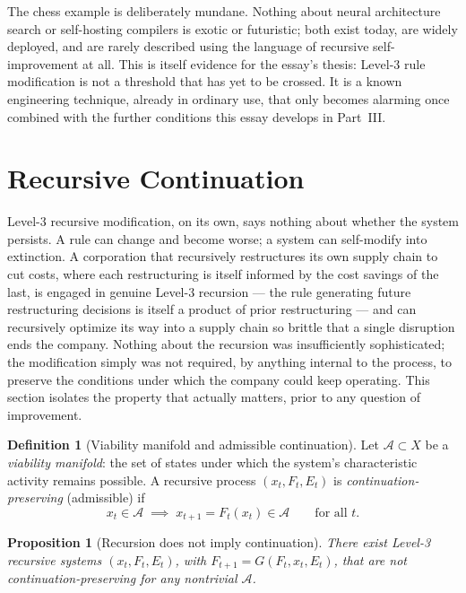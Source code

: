 \documentclass[12pt,a4paper]{article}
\theoremstyle{plain}
\newtheorem{proposition}[theorem]{Proposition}
\theoremstyle{definition}
\newtheorem{definition}[theorem]{Definition}
\theoremstyle{remark}
\newcommand{\Adm}{\mathcal{A}}
\begin{document}
The chess example is deliberately mundane. Nothing about neural architecture search or self-hosting compilers is exotic or futuristic; both exist today, are widely deployed, and are rarely described using the language of recursive self-improvement at all. This is itself evidence for the essay's thesis: Level-3 rule modification is not a threshold that has yet to be crossed. It is a known engineering technique, already in ordinary use, that only becomes alarming once combined with the further conditions this essay develops in Part~III.

\section{Recursive Continuation}
\label{sec:recursive-continuation}

Level-3 recursive modification, on its own, says nothing about whether the system persists. A rule can change and become worse; a system can self-modify into extinction. A corporation that recursively restructures its own supply chain to cut costs, where each restructuring is itself informed by the cost savings of the last, is engaged in genuine Level-3 recursion — the rule generating future restructuring decisions is itself a product of prior restructuring — and can recursively optimize its way into a supply chain so brittle that a single disruption ends the company. Nothing about the recursion was insufficiently sophisticated; the modification simply was not required, by anything internal to the process, to preserve the conditions under which the company could keep operating. This section isolates the property that actually matters, prior to any question of improvement.

\begin{definition}[Viability manifold and admissible continuation]
\label{def:admissibility}
Let $\Adm \subset X$ be a \emph{viability manifold}: the set of states under which the system's characteristic activity remains possible. A recursive process $(x_t, F_t, E_t)$ is \emph{continuation-preserving} (admissible) if
\[
x_t \in \Adm \;\implies\; x_{t+1} = F_t(x_t) \in \Adm \qquad \text{for all } t.
\]
\end{definition}

\begin{proposition}[Recursion does not imply continuation]
\label{prop:no-implication}
There exist Level-3 recursive systems $(x_t, F_t, E_t)$, with $F_{t+1}=G(F_t,x_t,E_t)$, that are not continuation-preserving for any nontrivial $\Adm$.
\end{proposition}
\end{document}
